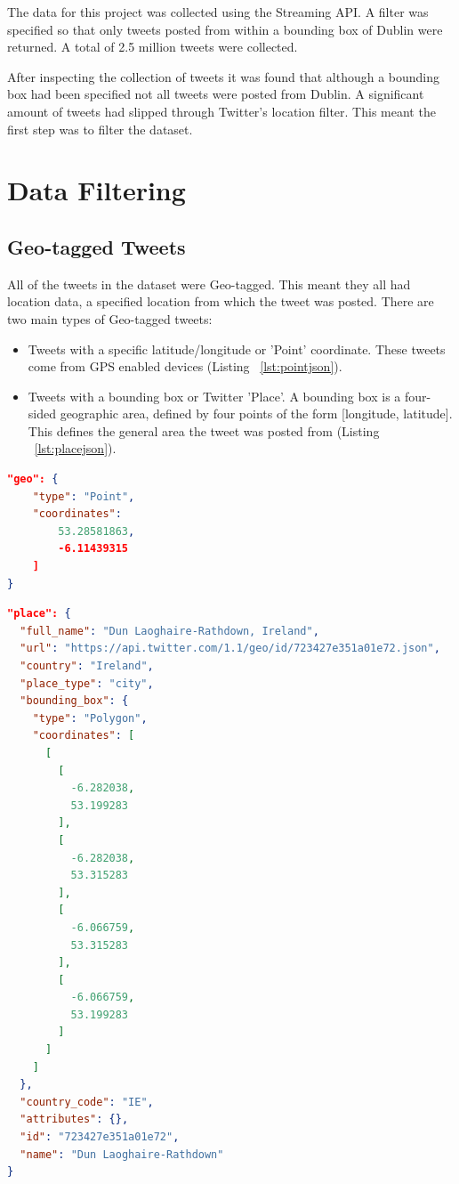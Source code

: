 The data for this project was collected using the Streaming API. A filter was specified so that only tweets posted from within a bounding box of Dublin were returned. A total of 2.5 million tweets were collected.

After inspecting the collection of tweets it was found that although a bounding box had been specified not all tweets were posted from Dublin. A significant amount of tweets had slipped through Twitter's location filter. This meant the first step was to filter the dataset.

\section{Data Filtering}

\subsection*{Geo-tagged Tweets}

All of the tweets in the dataset were Geo-tagged. This meant they all had location data, a specified location from which the tweet was posted. There are two main types of Geo-tagged tweets:
\begin{itemize}
    \item Tweets with a specific latitude/longitude or 'Point' coordinate. These tweets come from GPS enabled devices (Listing ~\ref{lst:pointjson}).
    \item Tweets with a bounding box or Twitter 'Place'. A bounding box is a four-sided geographic area, defined by four points of the form [longitude, latitude]. This defines the general area the tweet was posted from (Listing ~\ref{lst:placejson}).
\end{itemize}

\begin{lstlisting}[caption={Geo-tagged Tweet with Point Coordinate},
captionpos=b,label=lst:pointjson,language=json,firstnumber=1]
"geo": {
    "type": "Point",
    "coordinates": 
        53.28581863,
        -6.11439315
    ]
}
\end{lstlisting}

\begin{lstlisting}[caption={Geo-tagged Tweet with Twitter Place},captionpos=b,label=lst:placejson,language=json,firstnumber=1]
"place": {
  "full_name": "Dun Laoghaire-Rathdown, Ireland",
  "url": "https://api.twitter.com/1.1/geo/id/723427e351a01e72.json",
  "country": "Ireland",
  "place_type": "city",
  "bounding_box": {
    "type": "Polygon",
    "coordinates": [
      [
        [
          -6.282038,
          53.199283
        ],
        [
          -6.282038,
          53.315283
        ],
        [
          -6.066759,
          53.315283
        ],
        [
          -6.066759,
          53.199283
        ]
      ]
    ]
  },
  "country_code": "IE",
  "attributes": {},
  "id": "723427e351a01e72",
  "name": "Dun Laoghaire-Rathdown"
}
\end{lstlisting}

